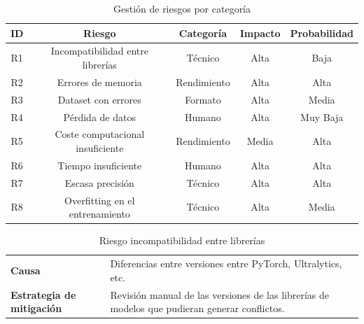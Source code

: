 \documentclass[12pt,a4paper,onecolumn,oneside]{report}
\begin{document}
\begin{table}[ht]
    \centering
    \caption{Gestión de riesgos por categoría}
    \begin{tabular}{|c|c|c|c|c|}
        \hline
        \textbf{ID} & \textbf{Riesgo} & \textbf{Categoría} & \textbf{Impacto} & \textbf{Probabilidad}\\
        \hline
        R1 & Incompatibilidad entre librerías & Técnico & Alta & Baja\\
        \hline
        R2 & Errores de memoria & Rendimiento & Alta & Alta\\
        \hline
        R3 & Dataset con errores & Formato & Alta & Media\\
        \hline
        R4 & Pérdida de datos & Humano & Alta & Muy Baja\\
        \hline
        R5 & Coste computacional insuficiente & Rendimiento & Media & Alta\\
        \hline
        R6 & Tiempo insuficiente & Humano & Alta & Alta\\
        \hline
        R7 & Escasa precisión & Técnico & Alta & Alta\\
        \hline
        R8 & Overfitting en el entrenamiento & Técnico & Alta & Media\\
        \hline
    \end{tabular}
    \label{Gestion-riesgos}
\end{table}

\begin{table}[ht]
    \centering
    \caption{Riesgo incompatibilidad entre librerías}
    \begin{tabularx}{1\textwidth}{| >{\centering\arraybackslash}X | >{\centering\arraybackslash}X |}
        \hline
        \multicolumn{2}{|c|}{\textbf{R1}}\\
        \hline 
        \textbf{Causa} &  Diferencias entre versiones entre PyTorch, Ultralytics, etc.\\
        \hline 
        \textbf{Estrategia de mitigación} & Revisión manual de las versiones de las librerías de modelos que pudieran generar conflictos.\\
        \hline
    \end{tabularx}
    \label{R1}
\end{table}
\end{document}
